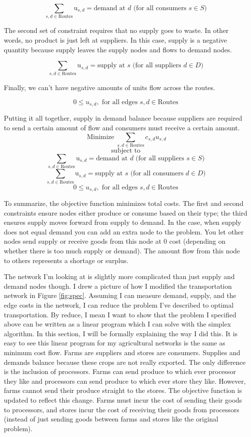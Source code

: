 \documentclass{report}
\begin{document}
$$\sum_{s,d \in \text{Routes}} \text{u}_{s,d}= \text{demand at } d \text{ (for all consumers } s \in S)$$

The second set of constraint requires that no supply goes to waste. In other words, no product is just left at suppliers. In this case, supply is a negative quantity because supply leaves the supply nodes and flows to demand nodes.

$$\sum_{s,d \in \text{Routes}} \text{u}_{s,d}= \text{supply at } s \text{ (for all suppliers } d \in D)$$

Finally, we can't have negative amounts of units flow across the routes.

$$0 \leq u_{s,d},  \text{ for all edges } s,d \in \text{Routes}$$

Putting it all together, supply in demand balance because suppliers are required to send a certain amount of flow and consumers must receive a certain amount.
$$\operatorname{Minimize} \sum_{s,d \in \text{Routes}} c_{s,d} u_{s,d}$$
$$\text{subject to}$$
$$\sum_{s,d \in \text{Routes}} \text{u}_{s,d}= \text{demand at } d \text{ (for all suppliers } s \in S)$$
$$\sum_{s,d \in \text{Routes}} \text{u}_{s,d}= \text{supply at } s \text{ (for all consumers } d \in D)$$
$$0 \leq u_{s,d}, \text{ for all edges } s,d \in \text{Routes}$$

To summarize, the objective function minimizes total costs. The first and second constraints ensure nodes either produce or consume based on their type; the third ensures supply moves forward from supply to demand.  In the case, when supply does not equal demand you can add an extra node to the problem. You let other nodes send supply or receive goods from this node at 0 cost (depending on whether there is too much supply or demand). The amount flow from this node to others represents a shortage or surplus.


The network I'm looking at is slightly more complicated than just supply and demand nodes though. I drew a picture of how I modified the transportation network in Figure \ref{fig:spec}. Assuming I can measure demand, supply, and the edge costs in the network, I can reduce the problem I've described to optimal transportation. By reduce, I mean I want to show that the problem I specified above can be  written as a linear program which I can solve with the simplex algorithm. In this section, I will be formally explaining the way I did this. It is easy to see this linear program for my agricultural networks is  the same as minimum cost flow. Farms are suppliers and stores are consumers. Supplies and demands balance because these crops are not really exported. The only difference is the inclusion of processors. Farms can send produce to which ever processor they like and processors can send produce to which ever store they like. However, farms cannot send their produce straight to the stores. The objective function is updated to reflect this change. Farms must incur the cost of sending their goods to processors, and stores incur the cost of receiving their goods from processors (instead of just sending goods between farms and stores like the original problem).
\end{document}
